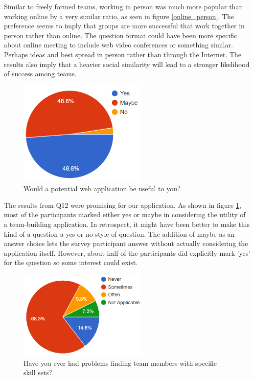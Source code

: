 \documentclass[conference]{IEEEtran}
\begin{document}
Similar to freely formed teams, working in person was much more popular than working online by a very similar
ratio, as seen in figure \ref{online_person}. The preference seems to imply that groups are
more successful that work together in person rather than online. The question format could have been more specific
about online meeting to include web video conferences or something similar. Perhaps ideas and best spread in person
rather than through the Internet. The results also imply that a heavier social similarity will lead to a stronger
likelihood of success among teams.

\begin{figure}[!ht]
\centering
\includegraphics[width=2.5in]{useful}
\caption{Would a potential web application be useful to you?}
\label{useful}
\end{figure}

The results from Q12 were promising for our application. As shown in figure \ref{useful}, most of the
participants marked either yes or maybe in considering the utility of a team-building application.
In retrospect, it might have been better to make this kind of a question a yes or no style of question.
The addition of maybe as an answer choice lets the survey participant answer without actually considering
the application itself. However, about half of the participants did explicitly mark 'yes' for the question
so some interest could exist. 

\begin{figure}[!ht]
\centering
\includegraphics[width=2.5in]{problems_finding_members}
\caption{Have you ever had problems finding team members with specific skill sets?}
\label{finding_members}
\end{figure}
\end{document}
